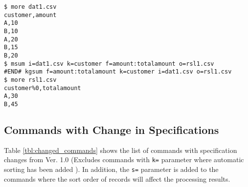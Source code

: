 \begin{Verbatim}[baselinestretch=0.7,frame=single]
$ more dat1.csv
customer,amount
A,10
B,10
A,20
B,15
B,20
$ msum i=dat1.csv k=customer f=amount:totalamount o=rsl1.csv
#END# kgsum f=amount:totalamount k=customer i=dat1.csv o=rsl1.csv
$ more rsl1.csv
customer%0,totalamount
A,30
B,45
\end{Verbatim}
%

\subsection{Commands with Change in Specifications \label{sect:changedcommands}}

Table \ref{tbl:changed_commands} shows the list of commands with specification changes from Ver. 1.0  (Excludes commands with \verb|k=| parameter where automatic sorting has been added ).  
In addition, the \verb|s=| parameter is added to the commands where the sort order of records will affect the processing results. 

